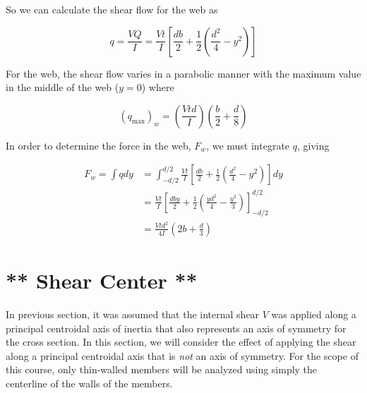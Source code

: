 \documentclass[
fontsize=10pt,
a4paper,
twosides=false,
open=any,
svgnames,
]{kaobook} %
\begin{document}
So we can calculate the shear flow for the web as

\begin{equation}
  q = \frac{VQ}{I} = \frac{Vt}{I}\left[ \frac{{db}}{2} + \frac{1}{2}\left( {\frac{d^2}{4} - y^2} \right) \right]
\end{equation}

For the web, the shear flow varies in a parabolic manner with the maximum value in the middle of the web ($y = 0$) where

\[(q_{\max })_w = \left( \frac{Vtd}{I} \right)\left( \frac{b}{2} + \frac{d}{8} \right)\]	

In order to determine the force in the web, $F_w$, we must integrate $q$, giving

\begin{align}
  {F_w} = \int {qdy}  &= \int_{ - d/2}^{d/2} {\frac{{Vt}}{I}\left[ {\frac{{db}}{2} + \frac{1}{2}\left( {\frac{{{d^2}}}{4} - {y^2}} \right)} \right]dy} \nonumber \\ 
   &= \frac{Vt}{I}\left[ \frac{dby}{2} + \frac{1}{2}\left( \frac{yd^2}{4} - \frac{y^3}{3} \right) \right]_{-d/2}^{d/2} \nonumber \\ 
   &= \frac{Vtd^2}{4I}\left( 2b + \frac{d}{3} \right)
\end{align}

\section{** Shear Center **}

In previous section, it was assumed that the internal shear $V$ was applied along a principal centroidal axis of inertia that also represents an axis of symmetry for the cross section. In this section, we will consider the effect of applying the shear along a principal centroidal axis that is \emph{not} an axis of symmetry. For the scope of this course, only thin-walled members will be analyzed using simply the centerline of the walls of the members.
\end{document}

